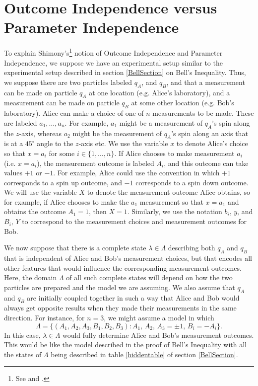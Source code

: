 
\section{Outcome Independence versus Parameter Independence}\label{OIVI}
To explain Shimony's\footnote{See \cite[146-147]{Shimony86} and \cite[7-9]{Butterfield}.}  notion of  Outcome Independence and Parameter Independence, we suppose we have an experimental setup similar to the experimental setup described in section \ref{BellSection} on Bell's Inequality. Thus, we suppose there are two particles labeled $q_A$, and $q_B$, and that a measurement can be made on particle  $q_A$ at one location (e.g. Alice's laboratory), and a measurement can be made on particle $q_B$ at some other location (e.g. Bob's laboratory). Alice can make a choice of one of $n$ measurements to be made. These are labeled $a_1,\ldots, a_n$. For example, $a_1$ might be a measurement of $q_A$'s spin along the $z$-axis, whereas $a_2$ might be the measurement of $q_A$'s spin along an axis that is at  a $45^\circ$ angle to the $z$-axis etc. We use the variable $x$ to denote Alice's choice so that $x=a_i$ for some $i\in\{1,\ldots,n\}$. If Alice chooses to make measurement $a_i$ (i.e. $x=a_i$), the measurement outcome is labeled $A_i$, and this outcome can take values $+1$ or $-1$. For example, Alice could use the convention in which $+1$ corresponds to a spin up outcome, and $-1$ corresponds to a spin down outcome. We will use the variable $X$ to denote the measurement outcome Alice obtains, so for example, if Alice chooses to make the $a_1$ measurement so that $x=a_1$ and obtains the outcome $A_1=1$, then $X=1$. Similarly, we use the notation $b_i,\, y$, and $B_i,\, Y$ to correspond to the measurement choices and measurement outcomes for Bob.

We now suppose that there is a complete state $\lambda\in\Lambda$ describing both $q_A$ and $q_B$ that is independent of Alice and Bob's measurement choices, but that encodes all other features that would influence the corresponding measurement outcomes. Here, the domain $\Lambda$ of all such complete states will depend on how the two particles are prepared and the model we are assuming. We also assume that  $q_A$ and $q_B$ are initially coupled together in such a way that Alice and Bob would always get opposite results when they made their measurements in the same direction. For instance, for $n=3$, we might assume a model in which 
\begin{equation}\label{bellLambda}
\Lambda=\big\{(A_1, A_2, A_3 ,B_1, B_2, B_3):A_1,\, A_2,\, A_3=\pm1,\, B_i=-A_i\big\}.
\end{equation}
 In this case, $\lambda\in\Lambda$ would fully determine Alice and Bob's measurement outcomes. This would be like the model described in the proof of Bell's Inequality with all the states of $\Lambda$ being described in table \ref{hiddentable} of section \ref{BellSection}. 
 
